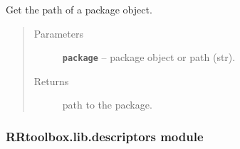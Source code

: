 \documentclass[letterpaper,10pt,english]{sphinxmanual}
\begin{document}

\begin{fulllineitems}
\label{RRtoolbox.lib:RRtoolbox.lib.config.getPackagePath}
Get the path of a package object.
\begin{quote}\begin{description}
\item[{Parameters}] \leavevmode
\textbf{\texttt{package}} -- package object or path (str).

\item[{Returns}] \leavevmode
path to the package.

\end{description}\end{quote}

\end{fulllineitems}



\subsubsection{RRtoolbox.lib.descriptors module}
\label{RRtoolbox.lib:module-RRtoolbox.lib.descriptors}\label{RRtoolbox.lib:rrtoolbox-lib-descriptors-module}
\end{document}
